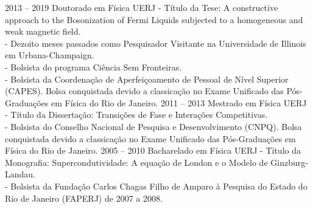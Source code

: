 \documentclass[9pt]{developercv} %
\begin{document}

\begin{entrylist}
	\entry
	{2013 -- 2019}
	{Doutorado em F\'isica}
	{UERJ}
	{- T\'itulo da Tese: A constructive approach to the Bosonization of Fermi Liquids subjected to a homogeneous and weak magnetic field.\\ 
		- Dezoito meses passados como Pesquisador Visitante na Universidade de Illinois em Urbana-Champaign.\\
		- Bolsista do programa Ci\^encia Sem Fronteiras.\\
		- Bolsista da Coordenação de Aperfeiçoamento de Pessoal de Nível Superior (CAPES). Bolsa conquistada devido a classicação no Exame Unificado das P\'os-Graduações em F\'isica do Rio de Janeiro.}
	\entry
	{2011 -- 2013}
	{Mestrado em Física}
	{UERJ}
	{- T\'itulo da Dissertação: Transições de Fase e Interações Competitivas.\\
		- Bolsista do Conselho Nacional de Pesquisa e Desenvolvimento (CNPQ). Bolsa conquistada devido a classicação no Exame Unificado das P\'os-Graduações em F\'isica do Rio de Janeiro.}
	\entry
	{2005 -- 2010}
	{Bacharelado em Física}
	{UERJ}
	{- Título da Monografia: Supercondutividade: A equação de London e o Modelo de Ginzburg-Landau.\\
		- Bolsista da Fundação Carlos Chagas Filho de Amparo à Pesquisa do Estado do Rio de  Janeiro (FAPERJ) de 2007 a 2008.}
\end{entrylist}

\newpage
{}
\end{document}
